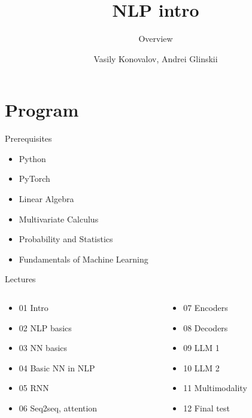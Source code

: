 \documentclass{beamer}
\title{NLP intro}
\subtitle{Overview}
\author{Vasily Konovalov, Andrei Glinskii}
\date{}
\begin{document}
\frame[plain]{\titlepage}

\section{Program}

\begin{frame}{Prerequisites}{}
    \begin{itemize}
        \item Python
        \item PyTorch
        \item Linear Algebra
        \item Multivariate Calculus
        \item Probability and Statistics
        \item Fundamentals of Machine Learning
    \end{itemize}
\end{frame}

\begin{frame}{Lectures}
    \begin{columns}
        \begin{column}{0.5\textwidth}
            \begin{itemize}
                \item 01 Intro
                \item 02 NLP basics
                \item 03 NN basics
                \item 04 Basic NN in NLP
                \item 05 RNN
                \item 06 Seq2seq, attention
            \end{itemize}
        \end{column}
        \begin{column}{0.5\textwidth}
            \begin{itemize}
                \item 07 Encoders
                \item 08 Decoders
                \item 09 LLM 1
                \item 10 LLM 2
                \item 11 Multimodality
                \item 12 Final test
            \end{itemize}
        \end{column}
    \end{columns}
\end{frame}
\end{document}
